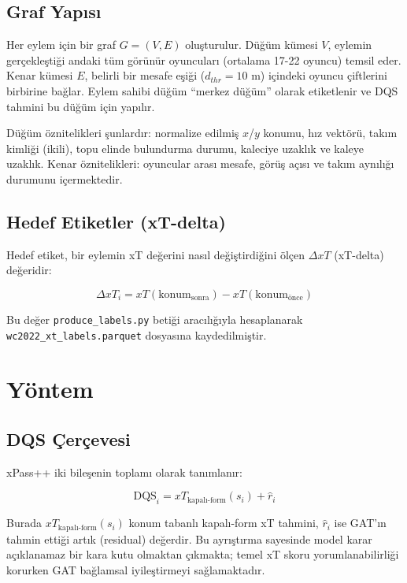 \documentclass[conference]{IEEEtran}
\begin{document}
\subsection{Graf Yapısı}

Her eylem için bir graf $G = (V, E)$ oluşturulur. Düğüm kümesi $V$, eylemin
gerçekleştiği andaki tüm görünür oyuncuları (ortalama 17-22 oyuncu) temsil eder.
Kenar kümesi $E$, belirli bir mesafe eşiği ($d_{thr} = 10$ m) içindeki oyuncu
çiftlerini birbirine bağlar. Eylem sahibi düğüm ``merkez düğüm'' olarak
etiketlenir ve DQS tahmini bu düğüm için yapılır.

Düğüm öznitelikleri şunlardır: normalize edilmiş $x$/$y$ konumu, hız vektörü,
takım kimliği (ikili), topu elinde bulundurma durumu, kaleciye uzaklık ve kaleye
uzaklık. Kenar öznitelikleri: oyuncular arası mesafe, görüş açısı ve takım aynılığı
durumunu içermektedir.

\subsection{Hedef Etiketler (xT-delta)}

Hedef etiket, bir eylemin xT değerini nasıl değiştirdiğini ölçen $\Delta xT$
(xT-delta) değeridir:

\begin{equation}
  \Delta xT_i = xT(\text{konum}_{\text{sonra}}) - xT(\text{konum}_{\text{önce}})
\end{equation}

Bu değer \texttt{produce\_labels.py} betiği aracılığıyla hesaplanarak
\texttt{wc2022\_xt\_labels.parquet} dosyasına kaydedilmiştir.

\section{Yöntem}

\subsection{DQS Çerçevesi}

xPass++ iki bileşenin toplamı olarak tanımlanır:

\begin{equation}
  \text{DQS}_i = xT_{\text{kapalı-form}}(s_i) + \hat{r}_i
  \label{eq:dqs}
\end{equation}

Burada $xT_{\text{kapalı-form}}(s_i)$ konum tabanlı kapalı-form xT tahmini,
$\hat{r}_i$ ise GAT'ın tahmin ettiği artık (residual) değerdir. Bu ayrıştırma
sayesinde model karar açıklanamaz bir kara kutu olmaktan çıkmakta; temel xT skoru
yorumlanabilirliği korurken GAT bağlamsal iyileştirmeyi sağlamaktadır.
\end{document}
